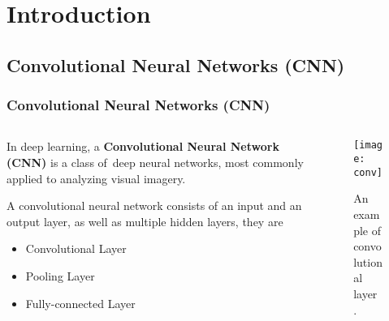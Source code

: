 \section{Introduction}


\subsection{Convolutional Neural Networks (CNN)}

\begin{frame}
\frametitle{Convolutional Neural Networks (CNN)}
\begin{columns}
\begin{column}{0.5\textwidth}
In deep learning, a \textbf{Convolutional Neural Network (CNN)} is a class of deep neural networks, most commonly applied to analyzing visual imagery.

\vspace{0.5cm}
A convolutional neural network consists of an input and an output layer, as well as multiple hidden layers, they are

\begin{itemize}
    \item Convolutional Layer
    \item Pooling Layer
    \item Fully-connected Layer
\end{itemize}
\end{column}

\begin{column}{0.5\textwidth}
\begin{figure}
    \centering
    \texttt{[image: conv]}
    \caption{An example of convolutional layer \footnotemark.}
\end{figure}
\end{column}
\end{columns}

\end{frame}


